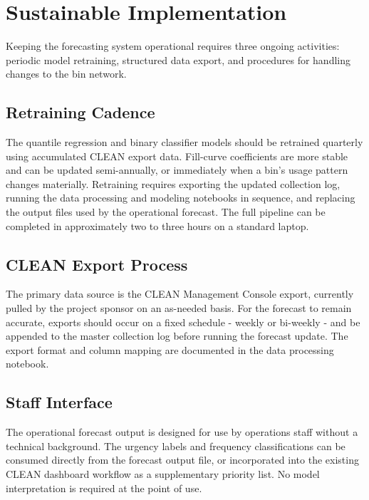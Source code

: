 \documentclass[11pt]{article}
\begin{document}
\newpage

\section{Sustainable Implementation}

Keeping the forecasting system operational requires three ongoing activities: periodic
model retraining, structured data export, and procedures for handling changes to the
bin network.

\subsection{Retraining Cadence}

The quantile regression and binary classifier models should be retrained quarterly
using accumulated CLEAN export data. Fill-curve coefficients are more stable and can
be updated semi-annually, or immediately when a bin's usage pattern changes materially.
Retraining requires exporting the updated collection log, running the data processing
and modeling notebooks in sequence, and replacing the output files used by the
operational forecast. The full pipeline can be completed in approximately two to three
hours on a standard laptop.

\subsection{CLEAN Export Process}

The primary data source is the CLEAN Management Console export, currently pulled by
the project sponsor on an as-needed basis. For the forecast to remain accurate, exports
should occur on a fixed schedule - weekly or bi-weekly - and be appended to the master
collection log before running the forecast update. The export format and column mapping
are documented in the data processing notebook.

\subsection{Staff Interface}

The operational forecast output is designed for use by operations staff without a
technical background. The urgency labels and frequency classifications can be consumed
directly from the forecast output file, or incorporated into the existing CLEAN
dashboard workflow as a supplementary priority list. No model interpretation is required
at the point of use.
\end{document}
